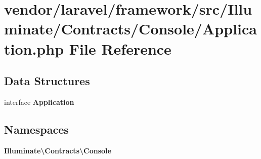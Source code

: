 \section{vendor/laravel/framework/src/\+Illuminate/\+Contracts/\+Console/\+Application.php File Reference}
\label{laravel_2framework_2src_2_illuminate_2_contracts_2_console_2_application_8php}
\subsection*{Data Structures}
\begin{DoxyCompactItemize}
\item 
interface {\bf Application}
\end{DoxyCompactItemize}
\subsection*{Namespaces}
\begin{DoxyCompactItemize}
\item 
 {\bf Illuminate\textbackslash{}\+Contracts\textbackslash{}\+Console}
\end{DoxyCompactItemize}
